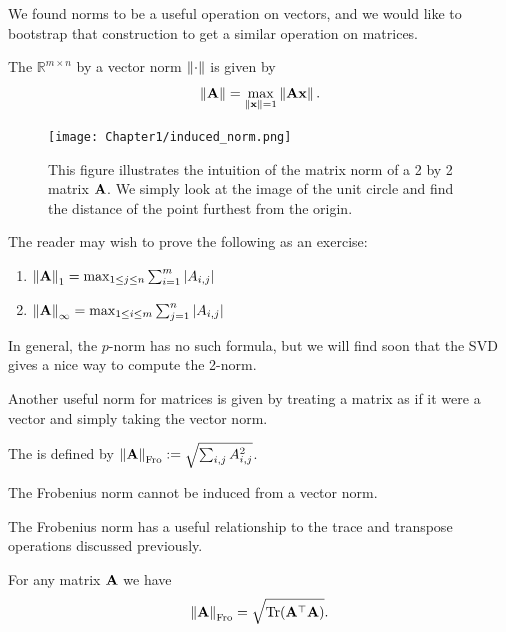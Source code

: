 We found norms to be a useful operation on vectors, and we would like to bootstrap that construction to get a similar operation on matrices.

\begin{definition}
The  $\mathbb R^{m \times n}$ by a vector norm $\norm{\cdot}$ is given by 
$$\norm{\MA} = \max_{\norm{\vx} = 1} \norm{\MA\vx}.$$
\end{definition}

\begin{figure}
\centering
  \texttt{[image: Chapter1/induced\_norm.png]}
  \caption{This figure illustrates the intuition of the matrix norm of a 2 by 2 matrix $\MA$. We simply look at the image of the unit circle and find the distance of the point furthest from the origin.}
\end{figure}

\begin{example}
    The reader may wish to prove the following as an exercise:
    \begin{enumerate}
        \item $\norm{\MA}_1 = \max_{1 \leq j \leq n} \sum_{i = 1}^m |A_{i,j}|$
        \item $\norm{\MA}_{\infty} = \max_{1 \leq i \leq m} \sum_{j = 1}^n |A_{i,j}|$
    \end{enumerate}
    In general, the $p$-norm has no such formula, but we will find soon that the SVD gives a nice way to compute the 2-norm.
\end{example}

Another useful norm for matrices is given by treating a matrix as if it were a vector and simply taking the vector norm.

\begin{definition}
The  is defined by
$\norm{\MA}_\Fro := \sqrt{\sum_{i,j} A_{i,j}^2}$.
\end{definition}

\begin{note}
The Frobenius norm cannot be induced from a vector norm.
\end{note}

The Frobenius norm has a useful relationship to the trace and transpose operations discussed previously.

\begin{proposition}
For any matrix $\MA$ we have
$$\norm{\MA}_\Fro  = \sqrt{\trace(\MA^\top\MA)}.$$
\end{proposition}

